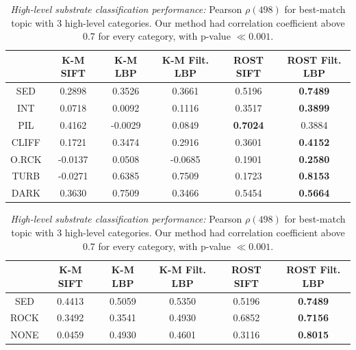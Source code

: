 \begin{table}
    \centering
    \caption{\emph{Detailed substrate classification performance:}
    Pearson $\rho\left(498\right)$ for best-match topic with 7 ground truth categories (see \ref{fig:substrate-best1gt}). For ROST Filt. LBP p-value was $\ll 0.001$. Our method had the highest correlation for every category except PIL}
    \begin{tabular}{|c|ccccc|}
        \hline
              & K-M SIFT & K-M LBP & K-M Filt. LBP & ROST SIFT & \textbf{ROST Filt. LBP}\\
        \hline \hline
        SED   &  0.2898 &  0.3526 &  0.3661 & 0.5196 & \textbf{0.7489} \\
        INT   &  0.0718 &  0.0092 &  0.1116 & 0.3517 & \textbf{0.3899} \\
        PIL   &  0.4162 & -0.0029 &  0.0849 & \textbf{0.7024} & 0.3884 \\
        CLIFF &  0.1721 &  0.3474 &  0.2916 & 0.3601 & \textbf{0.4152} \\
        O.RCK & -0.0137 &  0.0508 & -0.0685 & 0.1901 & \textbf{0.2580} \\
        TURB  & -0.0271 &  0.6385 &  0.7509 & 0.1723 & \textbf{0.8153} \\
        DARK  &  0.3630 &  0.7509 &  0.3466 & 0.5454 & \textbf{0.5664} \\
        \hline
    \end{tabular}
    \label{tab:substrate-performance-7}

    \caption{\emph{High-level substrate classification performance:}
    		 Pearson $\rho\left(498\right)$ for best-match topic with 3 high-level categories. Our method had correlation coefficient above 0.7 for every category, with p-value $\ll 0.001$.}
    \begin{tabular}{|c|ccccc|}
        \hline
             & K-M SIFT & K-M LBP & K-M Filt. LBP & ROST SIFT & \textbf{ROST Filt. LBP}\\
        \hline \hline
        SED  &  0.4413 &  0.5059 &  0.5350 & 0.5196 & \textbf{0.7489} \\
        ROCK &  0.3492 &  0.3541 &  0.4930 & 0.6852 & \textbf{0.7156} \\
        NONE &  0.0459 &  0.4930 &  0.4601 & 0.3116 & \textbf{0.8015} \\
        \hline
    \end{tabular}
    \label{tab:substrate-performance-3}
    
\end{table}

